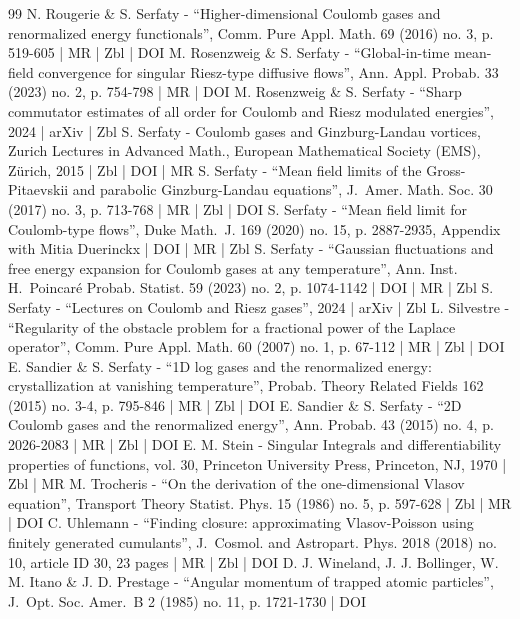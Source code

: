 \documentclass[10pt]{amsart}
\theoremstyle{plain}
\theoremstyle{definition}
\begin{document}
\begin{thebibliography}{99}
N. Rougerie \& S. Serfaty - “Higher-dimensional Coulomb gases and renormalized energy functionals”, Comm. Pure Appl. Math. 69 (2016) no. 3, p. 519-605 | MR | Zbl | DOI
M. Rosenzweig \& S. Serfaty - “Global-in-time mean-field convergence for singular Riesz-type diffusive flows”, Ann. Appl. Probab. 33 (2023) no. 2, p. 754-798 | MR | DOI
M. Rosenzweig \& S. Serfaty - “Sharp commutator estimates of all order for Coulomb and Riesz modulated energies”, 2024 | arXiv | Zbl
S. Serfaty - Coulomb gases and Ginzburg-Landau vortices, Zurich Lectures in Advanced Math., European Mathematical Society (EMS), Zürich, 2015 | Zbl | DOI | MR
S. Serfaty - “Mean field limits of the Gross-Pitaevskii and parabolic Ginzburg-Landau equations”, J. Amer. Math. Soc. 30 (2017) no. 3, p. 713-768 | MR | Zbl | DOI
S. Serfaty - “Mean field limit for Coulomb-type flows”, Duke Math. J. 169 (2020) no. 15, p. 2887-2935, Appendix with Mitia Duerinckx | DOI | MR | Zbl
S. Serfaty - “Gaussian fluctuations and free energy expansion for Coulomb gases at any temperature”, Ann. Inst. H. Poincaré Probab. Statist. 59 (2023) no. 2, p. 1074-1142 | DOI | MR | Zbl
S. Serfaty - “Lectures on Coulomb and Riesz gases”, 2024 | arXiv | Zbl
L. Silvestre - “Regularity of the obstacle problem for a fractional power of the Laplace operator”, Comm. Pure Appl. Math. 60 (2007) no. 1, p. 67-112 | MR | Zbl | DOI
E. Sandier \& S. Serfaty - “1D log gases and the renormalized energy: crystallization at vanishing temperature”, Probab. Theory Related Fields 162 (2015) no. 3-4, p. 795-846 | MR | Zbl | DOI
E. Sandier \& S. Serfaty - “2D Coulomb gases and the renormalized energy”, Ann. Probab. 43 (2015) no. 4, p. 2026-2083 | MR | Zbl | DOI
E. M. Stein - Singular Integrals and differentiability properties of functions, vol. 30, Princeton University Press, Princeton, NJ, 1970 | Zbl | MR
M. Trocheris - “On the derivation of the one-dimensional Vlasov equation”, Transport Theory Statist. Phys. 15 (1986) no. 5, p. 597-628 | Zbl | MR | DOI
C. Uhlemann - “Finding closure: approximating Vlasov-Poisson using finitely generated cumulants”, J. Cosmol. and Astropart. Phys. 2018 (2018) no. 10, article ID 30, 23 pages | MR | Zbl | DOI
D. J. Wineland, J. J. Bollinger, W. M. Itano \& J. D. Prestage - “Angular momentum of trapped atomic particles”, J. Opt. Soc. Amer. B 2 (1985) no. 11, p. 1721-1730 | DOI
\end{thebibliography}
\end{document}
